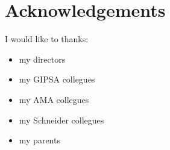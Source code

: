 \chapter*{Acknowledgements}
\noindent I would like to thanks:
\begin{itemize}
	\item my directors
	\item my GIPSA collegues
	\item my AMA collegues
	\item my Schneider collegues
	\item my parents
\end{itemize}


